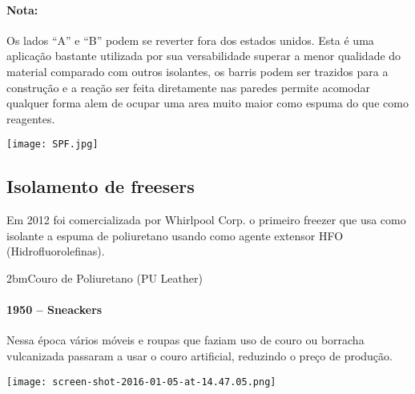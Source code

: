 \documentclass[\mainfilename]{subfiles}
\begin{document}
\begin{sectionBox}
\begin{sectionBox}
        \paragraph*{Nota:} Os lados ``A'' e ``B'' podem se reverter fora dos estados unidos.
        Esta é uma aplicação bastante utilizada por sua versabilidade superar a menor qualidade do material comparado com outros isolantes, os barris podem ser trazidos para a construção e a reação ser feita diretamente nas paredes permite acomodar qualquer forma alem de ocupar uma area muito maior como espuma do que como reagentes.
        \begin{center}
            \texttt{[image: SPF.jpg]}
        \end{center}
        \subsection{Isolamento de freesers\cite{WhirlpoolRefrigerators}}
        Em 2012 foi comercializada por Whirlpool Corp. o primeiro freezer que usa como isolante a espuma de poliuretano usando como agente extensor HFO (Hidrofluorolefinas).
        
    \end{sectionBox}

    \begin{sectionBox}2bm{Couro de Poliuretano (PU Leather)} %
        
        \paragraph*{1950 -- Sneackers\cite{Foster_2021}}
        Nessa época vários móveis e roupas que faziam uso de couro ou borracha vulcanizada passaram a usar o couro artificial, reduzindo o preço de produção. 
        \begin{center}
            \texttt{[image: screen-shot-2016-01-05-at-14.47.05.png]}
        \end{center}
        
    \end{sectionBox}
    
\end{sectionBox}
\end{document}
